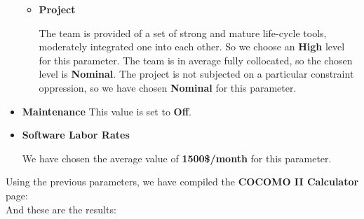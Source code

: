 \begin{itemize}
\begin{itemize}
\begin{itemize}
		\end{itemize}
		\item \textbf{Project}
		\begin{itemize}
			 The team is provided of a set of strong and mature life-cycle tools, moderately integrated one into each other. So we choose an \textbf{High} level for this parameter.
			 The team is in average fully collocated, so the chosen level is \textbf{Nominal}.
			 The project is not subjected on a particular constraint oppression, so we have chosen \textbf{Nominal} for this parameter.
		\end{itemize}
	\end{itemize}
	\item \textbf{Maintenance} This value is set to \textbf{Off}.
	\item \textbf{Software Labor Rates}
	\begin{itemize}
		 We have chosen the average value of \textbf{1500\$/month} for this parameter.
	\end{itemize}	
\end{itemize}
\newpage
Using the previous parameters, we have compiled the \textbf{COCOMO II Calculator} page:\\
And these are the results:\\
%